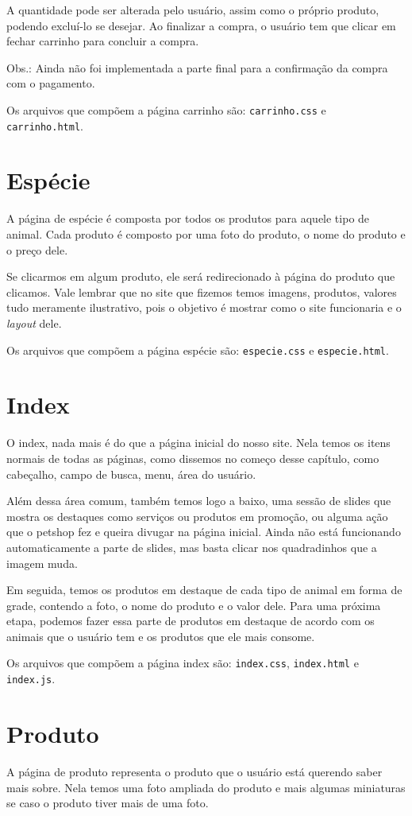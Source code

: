 A quantidade pode ser alterada pelo usuário, assim como o próprio produto, podendo excluí-lo se
desejar. Ao finalizar a compra, o usuário tem que clicar em fechar carrinho para concluir a compra.

Obs.: Ainda não foi implementada a parte final para a confirmação da compra com o pagamento.

Os arquivos que compõem a página carrinho são: \texttt{carrinho.css} e \texttt{carrinho.html}.

\section{Espécie}
A página de espécie é composta por todos os produtos para aquele tipo de animal. Cada produto é
composto por uma foto do produto, o nome do produto e o preço dele.

Se clicarmos em algum produto, ele será redirecionado à página do produto que clicamos. Vale lembrar
que no site que fizemos temos imagens, produtos, valores tudo meramente ilustrativo, pois o
objetivo é mostrar como o site funcionaria e o \emph{layout} dele.

Os arquivos que compõem a página espécie são: \texttt{especie.css} e \texttt{especie.html}.

\section{Index}
O index, nada mais é do que a página inicial do nosso site. Nela temos os itens normais de todas as
páginas, como dissemos no começo desse capítulo, como cabeçalho, campo de busca, menu, área do usuário.

Além dessa área comum, também temos logo a baixo, uma sessão de slides que mostra os destaques como
serviços ou produtos em promoção, ou alguma ação que o petshop fez e queira divugar na página inicial.
Ainda não está funcionando automaticamente a parte de slides, mas basta clicar nos quadradinhos que a
imagem muda.

Em seguida, temos os produtos em destaque de cada tipo de animal em forma de grade, contendo a foto,
o nome do produto e o valor dele. Para uma próxima etapa, podemos fazer essa parte de produtos em
destaque de acordo com os animais que o usuário tem e os produtos que ele mais consome.

Os arquivos que compõem a página index são: \texttt{index.css}, \texttt{index.html} e
\texttt{index.js}.

\section{Produto}
A página de produto representa o produto que o usuário está querendo saber mais sobre. Nela
temos uma foto ampliada do produto e mais algumas miniaturas se caso o produto tiver mais de
uma foto.

